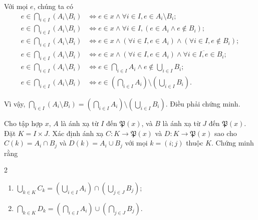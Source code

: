 Với mọi $e$, chúng ta có
\begin{align*}
   e \in \bigcap_{i \in I}\left(A_i \setminus B_i\right) &\iff e \in x \land \forall i \in I, e \in A_i \setminus B_i; \\
   e \in \bigcap_{i \in I}\left(A_i \setminus B_i\right) &\iff e \in x \land \forall i \in I, (e \in A_i \land e \notin B_i); \\
   e \in \bigcap_{i \in I}\left(A_i \setminus B_i\right) &\iff e \in x \land (\forall i \in I, e \in A_i) \land (\forall i \in I, e \notin B_i);\\
   e \in \bigcap_{i \in I}\left(A_i \setminus B_i\right) &\iff e \in x \land (\forall i \in I, e \in A_i) \land \overline{\forall i \in I, e \in B_i};\\
   e \in \bigcap_{i \in I}\left(A_i \setminus B_i\right) &\iff e \in \bigcap_{i \in I}A_i \land e  \notin \bigcup_{i \in I}B_i;\\
   e \in \bigcap_{i \in I}\left(A_i \setminus B_i\right) &\iff e  \in \left(\bigcap_{i \in I}A_i\right) \setminus \left(\bigcup_{i \in I}B_i\right).
\end{align*}

Vì vậy, $\bigcap_{i \in I}\left(A_i \setminus B_i\right) = \left(\bigcap_{i \in I}A_i\right) \setminus \left(\bigcup_{i \in I}B_i\right)$. Điều phải chứng minh.

\exercise Cho tập hợp $x$, $A$ là ánh xạ từ $I$ đến $\mathfrak{P}(x)$, và $B$ là ánh xạ từ $J$ đến $\mathfrak{P}(x)$. Đặt $K = I \times J$. Xác định ánh xạ $C : K \to \mathfrak{P}(x)$ và $D : K \to \mathfrak{P}(x)$ sao cho $C(k) = A_i \cap B_j$ và $D(k) = A_i \cup B_j$ với mọi $k = (i; j)$ thuộc $K$. Chứng minh rằng
\begin{multicols}{2}
   \begin{enumerate}
      \item $\bigcup_{k \in K}C_k = \left(\bigcup_{i \in I}A_i\right) \cap \left(\bigcup_{j \in J}B_j\right)$;
      \item $\bigcap_{k \in K}D_k = \left(\bigcap_{i \in I}A_i\right) \cup \left(\bigcap_{j \in J}B_j\right)$.
   \end{enumerate}
\end{multicols} 

\solution 

